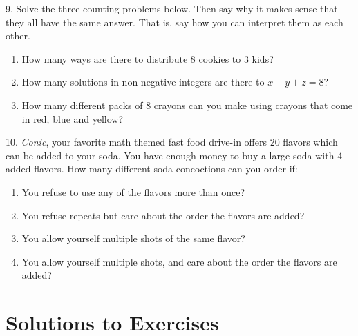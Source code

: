 \documentclass[10pt,]{book}
\theoremstyle{plain}
\theoremstyle{definition}
\theoremstyle{definition}
\theoremstyle{definition}
\numberwithin{equation}{section}
\begin{document}
\begin{exerciselist}
%
\par\smallskip
\item[9.]\hypertarget{exercise-90}{}
Solve the three counting problems below. Then say why it makes sense that they all have the same answer. That is, say how you can interpret them as each other.
%
\leavevmode%
\begin{enumerate}[label=(\alph*)]
\item\hypertarget{li-597}{}
How many ways are there to distribute 8 cookies to 3 kids?
%
\item\hypertarget{li-598}{}
How many solutions in non-negative integers are there to \(x+y+z = 8\)?
%
\item\hypertarget{li-599}{}
How many different packs of 8 crayons can you make using crayons that come in red, blue and yellow?
%
\end{enumerate}
\par\smallskip
\item[10.]\hypertarget{exercise-91}{}
\emph{Conic}, your favorite math themed fast food drive-in offers 20 flavors which can be added to your soda. You have enough money to buy a large soda with 4 added flavors. How many different soda concoctions can you order if:
%
\leavevmode%
\begin{enumerate}[label=(\alph*)]
\item\hypertarget{li-600}{}
You refuse to use any of the flavors more than once?
%
\item\hypertarget{li-601}{}
You refuse repeats but care about the order the flavors are added?
%
\item\hypertarget{li-602}{}
You allow yourself multiple shots of the same flavor?
%
\item\hypertarget{li-603}{}
You allow yourself multiple shots, and care about the order the flavors are added?
%
\end{enumerate}
\par\smallskip
\end{exerciselist}
%
%
%
\appendix
%
\typeout{************************************************}
\typeout{************************************************}
\chapter[Solutions to Exercises]{Solutions to Exercises}\label{appendix-1}
\end{document}

